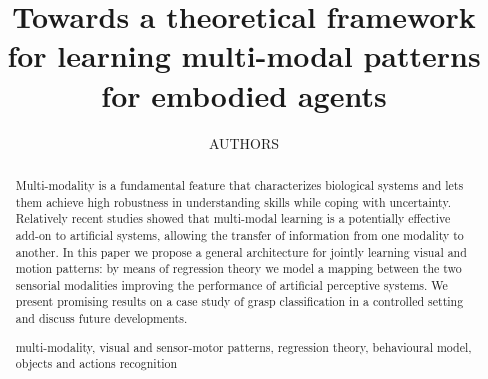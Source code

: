 \documentclass[runningheads]{llncs}
\newcommand{\keywords}[1]{\par\addvspace\baselineskip
\noindent\keywordname\enspace\ignorespaces#1}
\begin{document}
\mainmatter  %

\title{Towards a theoretical framework for learning multi-modal patterns for embodied agents}


%
%
\author{AUTHORS}
%


%
%

\maketitle


\begin{abstract}

Multi-modality is a fundamental feature that characterizes biological systems 
and lets them achieve high robustness in understanding skills while coping with
uncertainty.
Relatively recent studies showed that multi-modal learning
is a potentially effective add-on to artificial systems, allowing
the transfer of information from one modality to another.
In this paper we propose a general architecture for jointly learning visual and motion patterns: 
by means of regression theory we model a mapping between the two sensorial modalities improving 
the performance of artificial perceptive systems.
We present promising results on a case study of grasp classification in a controlled setting
and discuss future developments. 

\keywords{ multi-modality, visual and sensor-motor patterns, regression theory, behavioural model, objects and actions recognition 
}
\end{abstract}
\end{document}
